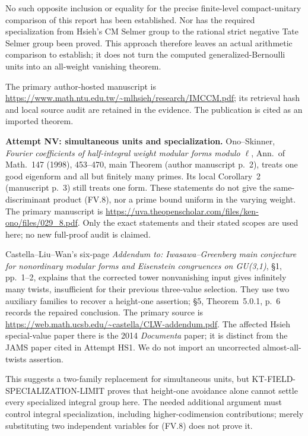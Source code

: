 \documentclass[11pt,a4paper]{article}
\theoremstyle{definition}
\renewcommand{\paragraph}[1]{\par\smallskip\noindent\textbf{#1}\quad\ignorespaces}
\begin{document}
No such opposite inclusion or equality for the precise
finite-level compact-unitary comparison of this report
has been established. Nor has the required specialization
from Hsieh's CM Selmer group to the rational strict negative
Tate Selmer group been proved. This approach therefore leaves
an actual arithmetic comparison to establish; it does not
turn the computed generalized-Bernoulli units into an
all-weight vanishing theorem.

The primary author-hosted manuscript is
\url{https://www.math.ntu.edu.tw/~mlhsieh/research/IMCCM.pdf};
its retrieval hash and local source audit are retained in the
evidence. The publication is cited as an imported theorem.

\paragraph{Attempt NV: simultaneous units and specialization.}
Ono--Skinner, \emph{Fourier coefficients of half-integral weight
modular forms modulo $\ell$}, Ann.\ of Math.\ 147 (1998),
453--470, main Theorem (author manuscript p.~2), treats one
good eigenform and all but finitely many primes. Its local
Corollary~2 (manuscript p.~3) still treats one form. These
statements do not give the same-discriminant product (FV.8),
nor a prime bound uniform in the varying weight. The primary
manuscript is
\url{https://uva.theopenscholar.com/files/ken-ono/files/029_8.pdf}.
Only the exact statements and their stated scopes are used here;
no new full-proof audit is claimed.

Castella--Liu--Wan's six-page \emph{Addendum to: Iwasawa--Greenberg
main conjecture for nonordinary modular forms and Eisenstein
congruences on GU(3,1)}, \S1, pp.~1--2, explains that the corrected
tower nonvanishing input gives infinitely many twists, insufficient
for their previous three-value selection. They use two auxiliary
families to recover a height-one assertion; \S5, Theorem~5.0.1,
p.~6 records the repaired conclusion. The primary source is
\url{https://web.math.ucsb.edu/~castella/CLW-addendum.pdf}.
The affected Hsieh special-value paper there is the 2014
\emph{Documenta} paper; it is distinct from the JAMS paper
cited in Attempt HS1. We do not import an uncorrected
almost-all-twists assertion.

This suggests a two-family replacement for simultaneous units,
but KT-FIELD-SPECIALIZATION-LIMIT proves that height-one avoidance
alone cannot settle every specialized integral group here.
The needed additional argument must control integral specialization,
including higher-codimension contributions; merely substituting
two independent variables for (FV.8) does not prove it.
\end{document}
